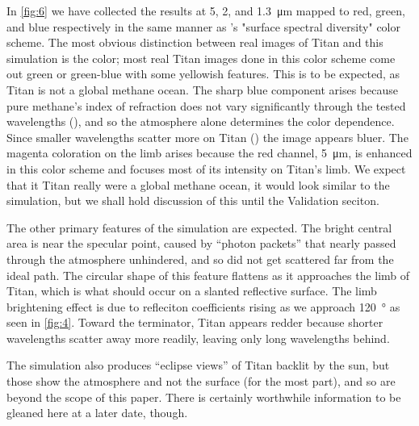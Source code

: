 \documentclass[linenumbers]{aastex631}
\begin{document}
In \ref{fig:6} we have collected the results at 5, 2, and \qty{1.3}{\micro\meter} mapped to red, green, and blue respectively in the same manner as \cite{Barnes2018}'s "surface spectral diversity" color scheme. The most obvious distinction between real images of Titan and this simulation is the color; most real Titan images done in this color scheme come out green or green-blue with some yellowish features. This is to be expected, as Titan is not a global methane ocean. The sharp blue component arises because pure methane's index of refraction does not vary significantly through the tested wavelengths (\cite{Martonchik1994}), and so the atmosphere alone determines the color dependence. Since smaller wavelengths scatter more on Titan (\cite{EsSayeh2023}) the image appears bluer. The magenta coloration on the limb arises because the red channel, \qty{5}{\micro\meter}, is enhanced in this color scheme and focuses most of its intensity on Titan's limb. We expect that it Titan really were a global methane ocean, it would look similar to the simulation, but we shall hold discussion of this until the Validation seciton.

The other primary features of the simulation are expected. The bright central area is near the specular point, caused by ``photon packets'' that nearly passed through the atmosphere unhindered, and so did not get scattered far from the ideal path. The circular shape of this feature flattens as it approaches the limb of Titan, which is what should occur on a slanted reflective surface. The limb brightening effect is due to refleciton coefficients rising as we approach \qty{120}{\degree} as seen in \ref{fig:4}. Toward the terminator, Titan appears redder because shorter wavelengths scatter away more readily, leaving only long wavelengths behind.

The simulation also produces ``eclipse views'' of Titan backlit by the sun, but those show the atmosphere and not the surface (for the most part), and so are beyond the scope of this paper. There is certainly worthwhile information to be gleaned here at a later date, though. 
\end{document}
